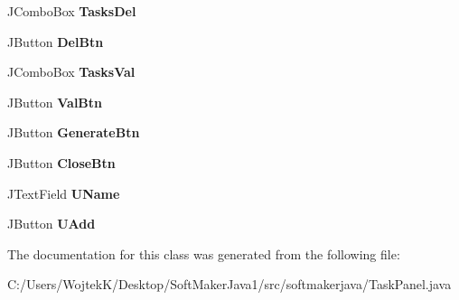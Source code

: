 \begin{DoxyCompactItemize}
\item 
J\+Combo\+Box {\bfseries Tasks\+Del}\hypertarget{classsoftmakerjava_1_1_task_panel_a8fd8c0aeb47bb0ebd42642e4a706de0b}{}\label{classsoftmakerjava_1_1_task_panel_a8fd8c0aeb47bb0ebd42642e4a706de0b}

\item 
J\+Button {\bfseries Del\+Btn}\hypertarget{classsoftmakerjava_1_1_task_panel_adbc49df13545eff13216238fe2f90689}{}\label{classsoftmakerjava_1_1_task_panel_adbc49df13545eff13216238fe2f90689}

\item 
J\+Combo\+Box {\bfseries Tasks\+Val}\hypertarget{classsoftmakerjava_1_1_task_panel_ab1d62a5c0cfb1e893085c79aaa9a54db}{}\label{classsoftmakerjava_1_1_task_panel_ab1d62a5c0cfb1e893085c79aaa9a54db}

\item 
J\+Button {\bfseries Val\+Btn}\hypertarget{classsoftmakerjava_1_1_task_panel_a1453a3fbe8d79b0df25addb328801be7}{}\label{classsoftmakerjava_1_1_task_panel_a1453a3fbe8d79b0df25addb328801be7}

\item 
J\+Button {\bfseries Generate\+Btn}\hypertarget{classsoftmakerjava_1_1_task_panel_a4859bcfabeffa09693f6a2c146e53f9f}{}\label{classsoftmakerjava_1_1_task_panel_a4859bcfabeffa09693f6a2c146e53f9f}

\item 
J\+Button {\bfseries Close\+Btn}\hypertarget{classsoftmakerjava_1_1_task_panel_ac77b3d07f600eb64ea912b61cd27906b}{}\label{classsoftmakerjava_1_1_task_panel_ac77b3d07f600eb64ea912b61cd27906b}

\item 
J\+Text\+Field {\bfseries U\+Name}\hypertarget{classsoftmakerjava_1_1_task_panel_a2d459c0b115f88c39c88e31284681ced}{}\label{classsoftmakerjava_1_1_task_panel_a2d459c0b115f88c39c88e31284681ced}

\item 
J\+Button {\bfseries U\+Add}\hypertarget{classsoftmakerjava_1_1_task_panel_a6f4d94c144330364d54f3a2155224ad9}{}\label{classsoftmakerjava_1_1_task_panel_a6f4d94c144330364d54f3a2155224ad9}

\end{DoxyCompactItemize}


The documentation for this class was generated from the following file\+:\begin{DoxyCompactItemize}
\item 
C\+:/\+Users/\+Wojtek\+K/\+Desktop/\+Soft\+Maker\+Java1/src/softmakerjava/Task\+Panel.\+java\end{DoxyCompactItemize}
